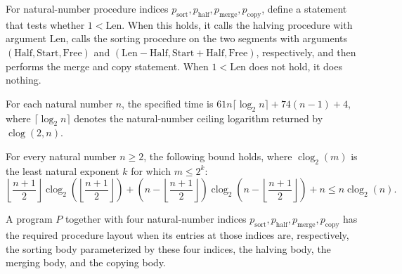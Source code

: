 \begin{definition}
\label{Light.sortBody}
\leanok
{}
For natural-number procedure indices
$p_{\mathrm{sort}},p_{\mathrm{half}},p_{\mathrm{merge}},p_{\mathrm{copy}}$, define a
statement that tests whether $1<\mathrm{Len}$. When this holds, it calls the halving
procedure with argument $\mathrm{Len}$, calls the sorting procedure on the two segments
with arguments $(\mathrm{Half},\mathrm{Start},\mathrm{Free})$ and
$(\mathrm{Len}-\mathrm{Half},\mathrm{Start}+\mathrm{Half},\mathrm{Free})$, respectively,
and then performs the merge and copy statement. When $1<\mathrm{Len}$ does not hold, it
does nothing.
\end{definition}

\begin{definition}
\label{Light.sortTime}
\leanok
For each natural number $n$, the specified time is $61n\lceil\log_2 n\rceil+74(n-1)+4$,
where $\lceil\log_2 n\rceil$ denotes the natural-number ceiling logarithm returned by
$\operatorname{clog}(2,n)$.
\end{definition}

\begin{theorem}
\label{Light.MergeSort.clog_split}
\leanok
{}
For every natural number $n\ge2$, the following bound holds, where
$\operatorname{clog}_2(m)$ is the least natural exponent $k$ for which $m\le2^k$:
\[\left\lfloor\frac{n+1}{2}\right\rfloor\operatorname{clog}_2\!\left(\left\lfloor\frac{n+1}{2}\right\rfloor\right)+\left(n-\left\lfloor\frac{n+1}{2}\right\rfloor\right)\operatorname{clog}_2\!\left(n-\left\lfloor\frac{n+1}{2}\right\rfloor\right)+n\le n\operatorname{clog}_2(n).\]
\end{theorem}

\begin{definition}
\label{Light.MergeSort.Procs}
\leanok
{}
A program $P$ together with four natural-number indices
$p_{\mathrm{sort}},p_{\mathrm{half}},p_{\mathrm{merge}},p_{\mathrm{copy}}$ has the
required procedure layout when its entries at those indices are, respectively, the
sorting body parameterized by these four indices, the halving body, the merging body,
and the copying body.
\end{definition}

